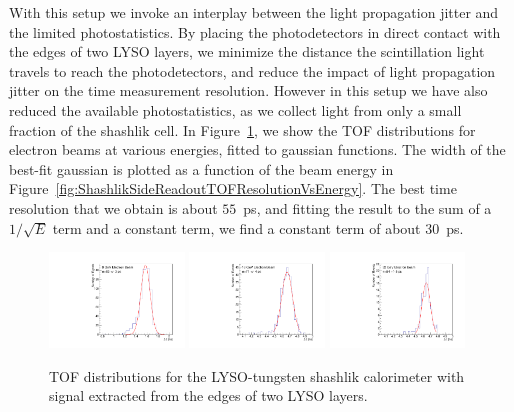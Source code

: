 With this setup we invoke an interplay between the light propagation jitter 
and the limited photostatistics. By placing the photodetectors in direct contact with the edges 
of two LYSO layers, we minimize the distance the scintillation light  travels to reach the 
photodetectors, and reduce the impact of light propagation jitter on the time measurement 
resolution. However in this setup we have also reduced the available photostatistics, as we collect 
light from only a small fraction of the shashlik cell. In Figure~\ref{fig:ShashlikSideReadoutTOF},
we show the TOF distributions for electron beams at various energies,
fitted to gaussian functions. The width of the best-fit gaussian is plotted as a
function of the beam energy in Figure~\ref{fig:ShashlikSideReadoutTOFResolutionVsEnergy}. The 
best time resolution that we obtain is about $55$~ps, and fitting the result to the sum of
a $1/\sqrt{E}$ term and a constant term, we find a constant term of about
$30$~ps. 

\begin{figure}[h] \centering
\includegraphics[width=0.32\textwidth]{figs/TOF_ShashlikSideReadout_Electron_8GeV} 
\includegraphics[width=0.32\textwidth]{figs/TOF_ShashlikSideReadout_Electron_16GeV} 
\includegraphics[width=0.32\textwidth]{figs/TOF_ShashlikSideReadout_Electron_32GeV} 
\caption{ TOF distributions for the LYSO-tungsten shashlik calorimeter
with signal extracted from the edges of two LYSO layers. } 
\label{fig:ShashlikSideReadoutTOF}
\end{figure}


